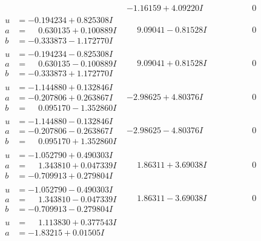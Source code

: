 \documentclass[1p]{elsarticle_modified}
\theoremstyle{definition}
\begin{document}
$$\begin{array}{c|c|c}
 & -1.16159 + 4.09220 I & \phantom{-0.000000 } 0 \\ \hline\begin{aligned}
u &= -0.194234 + 0.825308 I \\
a &= \phantom{-}0.630135 + 0.100889 I \\
b &= -0.333873 - 1.172770 I\end{aligned}
 & \phantom{-}9.09041 - 0.81528 I & \phantom{-0.000000 } 0 \\ \hline\begin{aligned}
u &= -0.194234 - 0.825308 I \\
a &= \phantom{-}0.630135 - 0.100889 I \\
b &= -0.333873 + 1.172770 I\end{aligned}
 & \phantom{-}9.09041 + 0.81528 I & \phantom{-0.000000 } 0 \\ \hline\begin{aligned}
u &= -1.144880 + 0.132846 I \\
a &= -0.207806 + 0.263867 I \\
b &= \phantom{-}0.095170 - 1.352860 I\end{aligned}
 & -2.98625 + 4.80376 I & \phantom{-0.000000 } 0 \\ \hline\begin{aligned}
u &= -1.144880 - 0.132846 I \\
a &= -0.207806 - 0.263867 I \\
b &= \phantom{-}0.095170 + 1.352860 I\end{aligned}
 & -2.98625 - 4.80376 I & \phantom{-0.000000 } 0 \\ \hline\begin{aligned}
u &= -1.052790 + 0.490303 I \\
a &= \phantom{-}1.343810 + 0.047339 I \\
b &= -0.709913 + 0.279804 I\end{aligned}
 & \phantom{-}1.86311 + 3.69038 I & \phantom{-0.000000 } 0 \\ \hline\begin{aligned}
u &= -1.052790 - 0.490303 I \\
a &= \phantom{-}1.343810 - 0.047339 I \\
b &= -0.709913 - 0.279804 I\end{aligned}
 & \phantom{-}1.86311 - 3.69038 I & \phantom{-0.000000 } 0 \\ \hline\begin{aligned}
u &= \phantom{-}1.113830 + 0.377543 I \\
a &= -1.83215 + 0.01505 I \\

\end{aligned}
\end{array}$$
\end{document}
